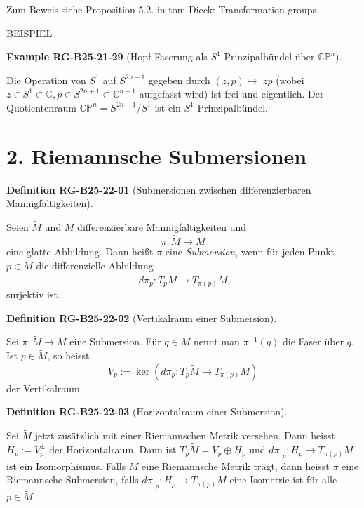 \documentclass[10pt, letterpaper]{article}
\newcommand{\CustomHeading}[3]{%
  \par\medskip\noindent%
  \textbf{#1 #2} \textnormal{(#3)}.\enskip%
}
\newenvironment{DEF}[2]{\begin{unitbox}\CustomHeading{Definition}{#1}{#2}}{\end{unitbox}}
\newenvironment{EXA}[2]{\begin{unitbox}\CustomHeading{Example}{#1}{#2}}{\end{unitbox}}
\begin{document}
Zum Beweis siehe Proposition 5.2. in tom Dieck: Transformation groups.



BEISPIEL 

\begin{EXA}{RG-B25-21-29}{Hopf-Faserung als $S^1$-Prinzipalbündel über $\mathbb{C P}^n$}
Die Operation von $S^{1}$ auf $S^{2 n+1}$ gegeben durch $(z, p) \mapsto$ $z p$ (wobei $z \in S^{1} \subset \mathbb{C}, p \in S^{2 n+1} \subset \mathbb{C}^{n+1}$ aufgefasst wird) ist frei und eigentlich. Der Quotientenraum $\mathbb{C P}^{n}=S^{2 n+1} / S^{1}$ ist ein $S^{1}$-Prinzipalbündel.
\end{EXA}




\pagebreak

\section*{2. Riemannsche Submersionen}



\begin{DEF}{RG-B25-22-01}{Submersionen zwischen differenzierbaren Mannigfaltigkeiten}
Seien $\tilde{M}$ und $M$ differenzierbare Mannigfaltigkeiten und
\[
\pi: \tilde{M} \rightarrow M
\]
eine glatte Abbildung. Dann heißt $\pi$ eine \emph{Submersion}, wenn für jeden Punkt $p \in \tilde{M}$ die differenzielle Abbildung
\[
d\pi_p : T_p \tilde{M} \longrightarrow T_{\pi(p)} M
\]
surjektiv ist.
\end{DEF}





\begin{DEF}{RG-B25-22-02}{Vertikalraum einer Submersion}
Sei $\pi: \tilde{M} \rightarrow M$ eine Submersion. Für $q \in M$ nennt man $\pi^{-1}(q)$ die Faser über $q$. Ist $p \in \tilde{M}$, so heisst
$$
V_{p}:=\operatorname{ker}\left(d \pi_{p}: T_{p} \tilde{M} \rightarrow T_{\pi(p)} M\right)
$$
der Vertikalraum.
\end{DEF}


\begin{DEF}{RG-B25-22-03}{Horizontalraum einer Submersion}
Sei $\tilde{M}$ jetzt zusätzlich mit einer Riemannschen Metrik versehen. Dann heisst $H_{p}:=V_{p}^{\perp}$ der Horizontalraum. Dann ist $T_{p} \tilde{M}=V_{p} \oplus H_{p}$ und $\left.d \pi\right|_{p}: H_{p} \rightarrow T_{\pi(p)} M$ ist ein Isomorphismus. Falls $M$ eine Riemannsche Metrik trägt, dann heisst $\pi$ eine Riemannsche Submersion, falls $\left.d \pi\right|_{p}: H_{p} \rightarrow T_{\pi(p)} M$ eine Isometrie ist für alle $p \in \tilde{M}$.
\end{DEF}
\end{document}
